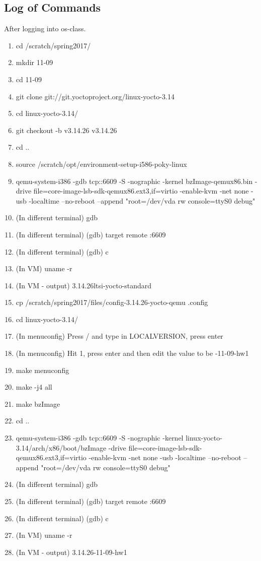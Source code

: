 \documentclass[journal, letterpaper, draftclsnofoot, onecolumn, 10pt]{IEEEtran}
\begin{document}
\subsection{Log of Commands}
After logging into os-class.
\begin{enumerate}
\item cd /scratch/spring2017/
\item mkdir 11-09
\item cd 11-09
\item git clone git://git.yoctoproject.org/linux-yocto-3.14
\item cd linux-yocto-3.14/
\item git checkout -b v3.14.26 v3.14.26
\item cd ..
\item source /scratch/opt/environment-setup-i586-poky-linux
\item qemu-system-i386 -gdb tcp::6609 -S -nographic -kernel bzImage-qemux86.bin -drive file=core-image-lsb-sdk-qemux86.ext3,if=virtio -enable-kvm -net none -usb -localtime --no-reboot --append "root=/dev/vda rw console=ttyS0 debug"
\item (In different terminal) gdb
\item (In different terminal) (gdb) target remote :6609
\item (In different terminal) (gdb) c
\item (In VM) uname -r
\item (In VM - output) 3.14.26ltsi-yocto-standard
\item cp /scratch/spring2017/files/config-3.14.26-yocto-qemu .config
\item cd linux-yocto-3.14/
\item (In menuconfig) Press / and type in LOCALVERSION, press enter
\item (In menuconfig) Hit 1, press enter and then edit the value to be -11-09-hw1
\item make menuconfig
\item make -j4 all
\item make bzImage
\item cd ..
\item qemu-system-i386 -gdb tcp::6609 -S -nographic -kernel linux-yocto-3.14/arch/x86/boot/bzImage -drive file=core-image-lsb-sdk-qemux86.ext3,if=virtio -enable-kvm -net none -usb -localtime --no-reboot --append "root=/dev/vda rw console=ttyS0 debug"
\item (In different terminal) gdb
\item (In different terminal) (gdb) target remote :6609
\item (In different terminal) (gdb) c
\item (In VM) uname -r
\item (In VM - output) 3.14.26-11-09-hw1
\end{enumerate}
\end{document}
